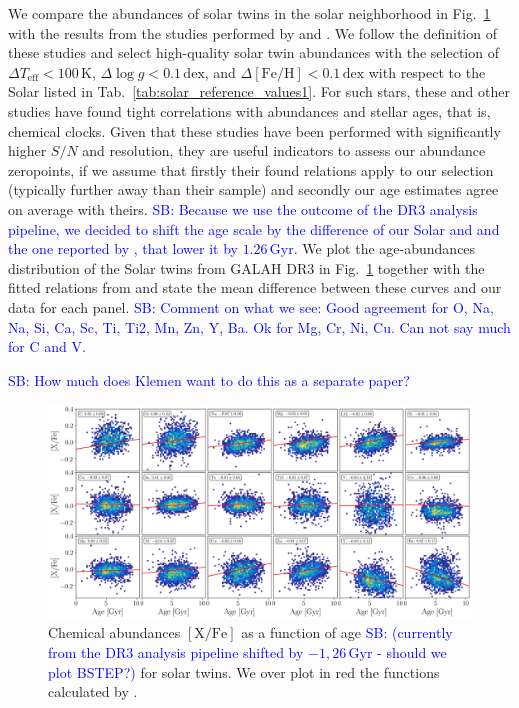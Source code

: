 \documentclass[fleqn,usenatbib,useAMS]{mnras}
\newcommand\SB[1]{\textcolor{blue}{SB: #1}}
\begin{document}
We compare the abundances of solar twins in the solar neighborhood in Fig.~\ref{fig:solar_twin_comparison} with the results from the studies performed by \citet{Spina2016} and \citet{Bedell2018}. We follow the definition of these studies and select high-quality solar twin abundances with the selection of $\Delta T_\text{eff} < 100\,\mathrm{K}$, $\Delta \log g < 0.1\,\mathrm{dex}$, and $\Delta \mathrm{[Fe/H]} < 0.1\,\mathrm{dex}$ with respect to the Solar listed in Tab.~\ref{tab:solar_reference_values1}.
For such stars, these and other studies \citep[e.g.][]{Nissen2015} have found tight correlations with abundances and stellar ages, that is, chemical clocks. Given that these studies have been performed with significantly higher $S/N$ and resolution, they are useful indicators to assess our abundance zeropoints, if we assume that firstly their found relations apply to our selection (typically further away than their sample) and secondly our age estimates agree on average with theirs. \SB{Because we use the outcome of the DR3 analysis pipeline, we decided to shift the age scale by the difference of our Solar and and the one reported by \cite{Bonanno2002}, that lower it by $1.26\,\mathrm{Gyr}$.} We plot the age-abundances distribution of the Solar twins from GALAH DR3 in Fig.~\ref{fig:solar_twin_comparison} together with the fitted relations from \citet{Bedell2018} and state the mean difference between these curves and our data for each panel. \SB{Comment on what we see: Good agreement for O, Na, Na, Si, Ca, Sc, Ti, Ti2, Mn, Zn, Y, Ba. Ok for Mg, Cr, Ni, Cu. Can not say much for C and V.}

\SB{How much does Klemen want to do this as a separate paper?}

\begin{figure}
\centering
\includegraphics[width=\textwidth]{figures/solar_twin_comparison.png}
\caption{Chemical abundances $\mathrm{[X/Fe]}$ as a function of age \SB{(currently from the DR3 analysis pipeline shifted by $-1,26\,\mathrm{Gyr}$ - should we plot BSTEP?)} for solar twins. We over plot in red the functions calculated by \citet{Spina2016, Bedell2018}.}
\label{fig:solar_twin_comparison}
\end{figure}
\end{document}

